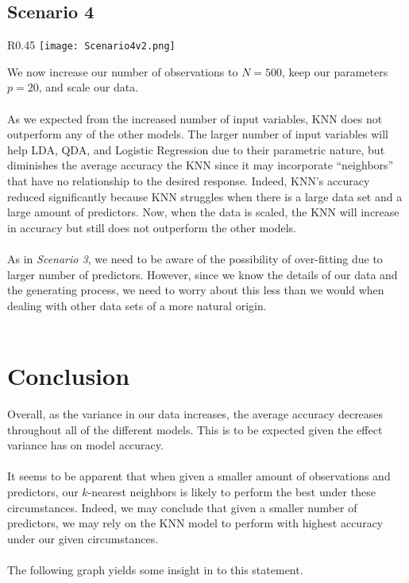 \documentclass[11pt, oneside]{article}
\begin{document}

\subsection{Scenario 4}
\begin{wrapfigure}[]{R}{0.45\textwidth}
\vspace{-0.55cm}
\texttt{[image: Scenario4v2.png]}
\vspace{-0.75cm}
\end{wrapfigure}
We now increase our number of observations to $N=500$, keep our parameters $p=20$, and scale our data.\\
\\
As we expected from the increased number of input variables, KNN does not outperform any of the other models. The larger number of input variables will help LDA, QDA, and Logistic Regression due to their parametric nature, but diminishes the average accuracy the KNN since it may incorporate ``neighbors'' that have no relationship to the desired response. Indeed, KNN’s accuracy reduced significantly because KNN struggles when there is a large data set and a large amount of predictors. Now, when the data is scaled, the KNN will increase in accuracy but still does not outperform the other models.\\
\\
As in \emph{Scenario 3}, we need to be aware of the possibility of over-fitting due to larger number of predictors. However, since we know the details of our data and the generating process, we need to worry about this less than we would when dealing with other data sets of a more natural origin.\\
\\







\section{Conclusion}

Overall, as the variance in our data increases, the average accuracy decreases throughout all of the different models. This is to be expected given the effect variance has on model accuracy.\\
\\
It seems to be apparent that when given a smaller amount of observations and predictors, our $k$-nearest neighbors is likely to perform the best under these circumstances. Indeed, we may conclude that given a smaller number of predictors, we may rely on the KNN model to perform with highest accuracy under our given circumstances.\\
\\
The following graph yields some insight in to this statement.\\
\end{document}
